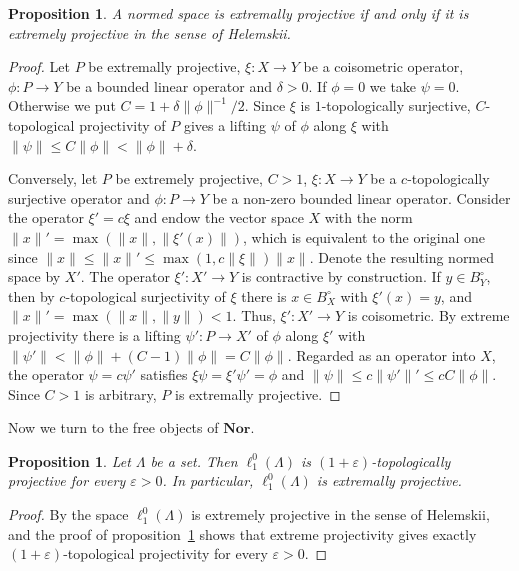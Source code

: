 \documentclass[12pt]{article}
\newtheorem{proposition}[theorem]{Proposition}
\newcommand{\Nor}{\mathbf{Nor}}
\newcommand{\lo}[1]{\ell_1^0(#1)}
\newcommand{\norm}[1]{\lVert #1\rVert}
\begin{document}
\begin{proposition}\label{EquivWithHelemskii} A normed space is extremally
    projective if and only if it is extremely projective in the sense of
    Helemskii.
\end{proposition}
\begin{proof} Let $P$ be extremally projective, $\xi:X\to Y$ be a coisometric
    operator, $\phi:P\to Y$ be a bounded linear operator and $\delta>0$. If
    $\phi=0$ we take $\psi=0$. Otherwise we put
    $C=1+\delta\norm{\phi}^{-1}/2$. Since $\xi$ is $1$-topologically surjective,
    $C$-topological projectivity of $P$ gives a lifting $\psi$ of $\phi$ along
    $\xi$ with $\norm{\psi}\leq C\norm{\phi}<\norm{\phi}+\delta$.

    Conversely, let $P$ be extremely projective, $C>1$, $\xi:X\to Y$ be a
    $c$-topologically surjective operator and $\phi:P\to Y$ be a non-zero
    bounded linear operator. Consider the operator $\xi'=c\xi$ and endow the
    vector space $X$ with the norm $\norm{x}'=\max(\norm{x},\norm{\xi'(x)})$,
    which is equivalent to the original one since $\norm{x}\leq\norm{x}'\leq
    \max(1,c\norm{\xi})\norm{x}$. Denote the resulting normed space by $X'$.
    The operator $\xi':X'\to Y$ is contractive by construction. If $y\in
    B_Y^\circ$, then by $c$-topological surjectivity of $\xi$ there is $x\in
    B_X^\circ$ with $\xi'(x)=y$, and $\norm{x}'=\max(\norm{x},\norm{y})<1$.
    Thus, $\xi':X'\to Y$ is coisometric. By extreme projectivity there is a
    lifting $\psi':P\to X'$ of $\phi$ along $\xi'$ with $\norm{\psi'}<
    \norm{\phi}+(C-1)\norm{\phi}=C\norm{\phi}$. Regarded as an operator into
    $X$, the operator $\psi=c\psi'$ satisfies $\xi\psi=\xi'\psi'=\phi$ and
    $\norm{\psi}\leq c\norm{\psi'}'\leq cC\norm{\phi}$. Since $C>1$ is arbitrary,
    $P$ is extremally projective.
\end{proof}

Now we turn to the free objects of $\Nor$.

\begin{proposition}\label{FreeIsExtrProj} Let $\Lambda$ be a set. Then
    $\lo{\Lambda}$ is $(1+\varepsilon)$-topologically projective for every
    $\varepsilon>0$. In particular, $\lo{\Lambda}$ is extremally projective.
\end{proposition}
\begin{proof} By \cite[proposition 2.2]{HelExtrProjSeqAlg} the space
    $\lo{\Lambda}$ is extremely projective in the sense of Helemskii, and
    the proof of proposition~\ref{EquivWithHelemskii} shows that extreme
    projectivity gives exactly
    $(1+\varepsilon)$-topological projectivity for every $\varepsilon>0$.
\end{proof}
\end{document}
